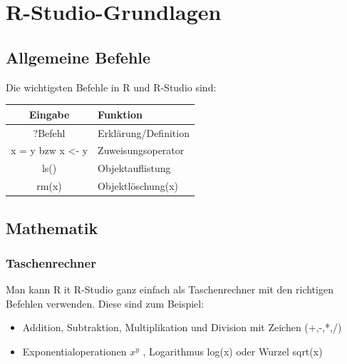 \documentclass[a4paper,10pt]{scrartcl}
\begin{document}
\section{R-Studio-Grundlagen}
\subsection{Allgemeine Befehle}
Die wichtigsten Befehle in R und R-Studio sind:
\begin{table}[H]
    \begin{tabular}{|c|l|}\hline
Eingabe&Funktion\\\hline
?Befehl&Erklärung/Definition\\\hline
x = y bzw x <- y&Zuweisungsoperator\\\hline
ls()&Objektauflistung\\\hline
rm(x)&Objektlöschung(x)\\\hline
    \end{tabular}
    \label{tab:my_label}
\end{table}
\subsection{Mathematik}
\subsubsection{Taschenrechner}
Man kann R it R-Studio ganz einfach als Taschenrechner mit den richtigen Befehlen verwenden. Diese sind zum Beispiel: \newline
\begin{itemize}
    \item Addition, Subtraktion, Multiplikation und Division mit Zeichen (+,-,*,/)
    \item Exponentialoperationen $x^y$ , Logarithmus log(x) oder Wurzel sqrt(x) 
    
\end{itemize}
\end{document}
